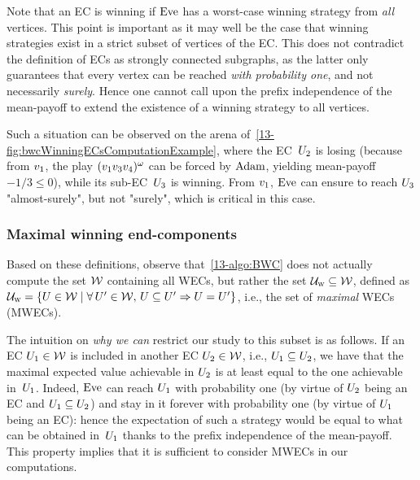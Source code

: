 \begin{example}
Note that an EC is winning if $\text{Eve}$ has a worst-case winning strategy from \textit{all} vertices. This point is important as it may well be the case that winning strategies exist in a strict subset of vertices of the EC. This does not contradict the definition of ECs as strongly connected subgraphs, as the latter only guarantees that every vertex can be reached \textit{with probability one}, and not necessarily \textit{surely}. Hence one cannot call upon the prefix independence of the mean-payoff to extend the existence of a winning strategy to all vertices.

Such a situation can be observed on the arena of~\cref{13-fig:bwcWinningECsComputationExample}, where the EC~$U_{2}$ is losing (because from $v_{1}$, the play $(v_{1}v_{3}v_{4})^{\omega}$ can be forced by $\text{Adam}$, yielding mean-payoff $-1/3 \leq 0$), while its sub-EC~$U_{3}$ is winning. From $v_{1}$, $\text{Eve}$ can ensure to reach $U_{3}$ "almost-surely", but not "surely", which is critical in this case.
\end{example}


\subsubsection*{Maximal winning end-components} Based on these definitions, observe that~\cref{13-algo:BWC} does not actually compute the set $\mathcal{W}$ containing all WECs, but rather the set $\mathcal{U}_{\textsc{w}} \subseteq \mathcal{W}$, defined as $\mathcal{U}_{\textsc{w}} = \{U \in \mathcal{W} \mid \forall\, U' \in \mathcal{W},\, U \subseteq U' \Rightarrow U = U'\}$, i.e., the set of \textit{maximal} WECs (MWECs).

The intuition on \textit{why we can} restrict our study to this subset is as follows. If an EC $U_{1} \in \mathcal{W}$ is included in another EC $U_{2} \in \mathcal{W}$, i.e., $U_{1} \subseteq U_{2}$, we have that the maximal expected value achievable in $U_{2}$ is at least equal to the one achievable in~$U_{1}$. Indeed, $\text{Eve}$ can reach $U_{1}$ with probability one (by virtue of $U_{2}$ being an EC and $U_{1} \subseteq U_{2}$) and stay in it forever with probability one (by virtue of $U_{1}$ being an EC): hence the expectation of such a strategy would be equal to what can be obtained in~$U_{1}$ thanks to the prefix independence of the mean-payoff. This property implies that it is sufficient to consider MWECs in our computations.

